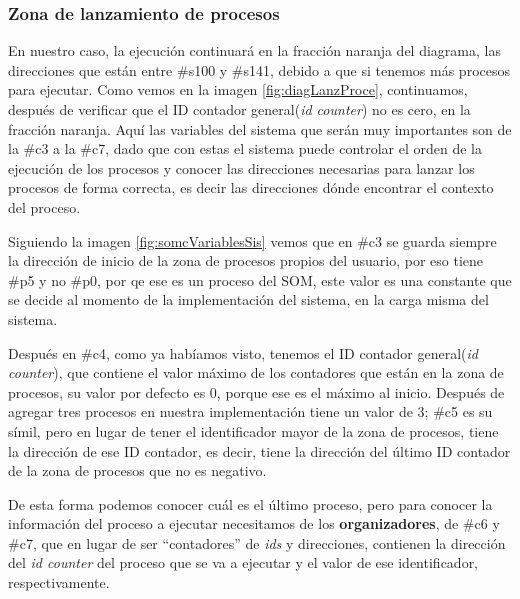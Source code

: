 \documentclass[letterpaper,12pt,oneside]{book}
\begin{document}
		
		


		\subsubsection{Zona de lanzamiento de procesos}		
		En nuestro caso, la ejecución continuará en la fracción naranja del diagrama, las direcciones que están entre \#s100 y \#s141, debido a que si tenemos más procesos para ejecutar. Como vemos en
		la imagen \ref{fig:diagLanzProce}, continuamos, después de verificar que el ID contador general(\textit{id counter}) no es cero, en la fracción naranja. Aquí
		las variables del sistema que serán muy importantes son de la \#c3 a la \#c7, dado que con estas el sistema puede controlar el orden de la ejecución
		de los procesos y conocer las direcciones necesarias para lanzar los procesos de forma correcta, es decir las direcciones dónde encontrar
		el contexto del proceso. 
  
        Siguiendo la imagen \ref{fig:somcVariablesSis} vemos que en \#c3 se guarda siempre la dirección de inicio de la
		zona de procesos propios del usuario, por eso tiene \#p5 y no \#p0, por qe ese es un proceso del SOM, este valor es una constante que se decide
		al momento de la implementación del sistema, en la carga misma del sistema.
  
        Después en \#c4, como ya habíamos visto, tenemos el ID contador general(\textit{id counter}), que
		contiene el valor máximo de los contadores que están en la zona de procesos, su valor por defecto es 0, porque ese es el máximo al inicio. Después de agregar tres procesos 
		en nuestra implementación tiene un valor de 3; \#c5 es su símil, pero en lugar de tener el identificador mayor
		de la zona de procesos, tiene la dirección de ese ID contador, es decir, tiene la dirección del último ID contador de la zona de procesos
		que no es negativo.
  
        De esta forma podemos conocer cuál es el último proceso, pero para conocer la información del proceso a ejecutar necesitamos de los \textbf{organizadores}, de \#c6 y \#c7, que en lugar de ser ``contadores''
		de \textit{ids} y direcciones, contienen la dirección del \textit{id counter} del proceso que se va a ejecutar y el valor de ese identificador, respectivamente.
		
\end{document}

